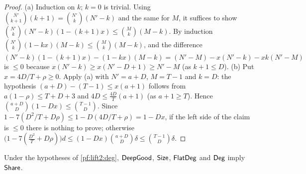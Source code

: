 \begin{proof}
(a) Induction on $k$; $k=0$ is trivial. Using $\binom{N'}{k+1}(k+1)=\binom{N'}k(N'-k)$ and the same for $M$, it suffices
to show $\binom{N'}k(N'-k)(1-(k+1)x)\le\binom Mk(M-k)$. By induction $\binom{N'}k(1-kx)(M-k)\le\binom Mk(M-k)$, and the
difference $(N'-k)(1-(k+1)x)-(1-kx)(M-k)=(N'-M)-x(N'-k)-xk(N'-M)$ is $\le0$ because
$x(N'-k)\ge x(N'-D+1)\ge N'-M$ (as $k+1\le D$).
(b) Put $x=4D/T+\rho\ge0$. Apply (a) with $N'=a+D$, $M=T-1$ and $k=D$: the hypothesis $(a+D)-(T-1)\le
x(a+1)$ follows from $a(1-\rho)\le T+D+3$ and $4D\le\frac{4D}T(a+1)$ (as $a+1\ge T$). Hence
$\binom{a+D}D(1-Dx)\le\binom{T-1}D$. Since $1-7(D^2/T+D\rho)\le1-D(4D/T+\rho)=1-Dx$, if the left side of the claim is
$\le0$ there is nothing to prove; otherwise $\bigl(1-7(\frac{D^2}T+D\rho)\bigr)d\le(1-Dx)\binom{a+D}D\delta\le
\binom{T-1}D\delta$.
\end{proof}

\begin{proposition}[Shares]\label{pf:lift2:share}
Under the hypotheses of \cref{pf:lift2:deg}, $\mathsf{DeepGood}$, $\mathsf{Size}$, $\mathsf{FlatDeg}$ and
$\mathsf{Deg}$ imply $\mathsf{Share}$.
\end{proposition}

